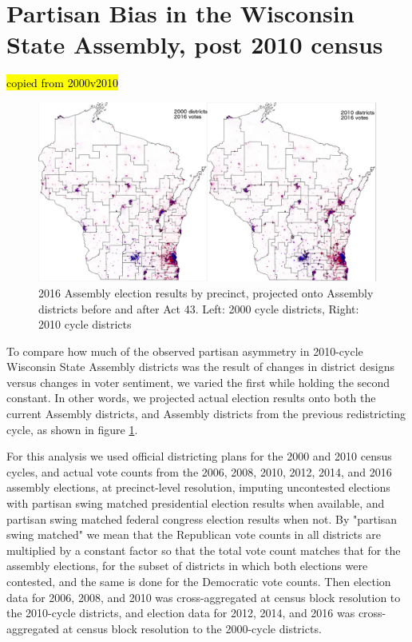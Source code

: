 \documentclass[preprint,12pt]{article}
\newcommand{\KB}[2][cyan]{ {\sethlcolor{#1} \hl{#2}} }
\begin{document}
\section{Partisan Bias in the Wisconsin State Assembly, post 2010 census\label{sec:Wis}}

\KB{copied from 2000v2010}

\begin{figure}[htb!]
    \begin{center}
        \includegraphics[scale=0.35]{../Figures/WI_compared/precincts_pop_combined.png}
        \caption{2016 Assembly election results by precinct, projected onto Assembly districts before and after Act 43. Left: 2000 cycle districts, Right: 2010 cycle districts}\label{fig:MapsWI}
    \end{center}
\end{figure}

To compare how much of the observed partisan asymmetry in 2010-cycle Wisconsin State Assembly districts was the result of changes in district designs versus changes in voter sentiment, we varied the first while holding the second constant.
In other words, we projected actual election results onto both the current Assembly districts, and Assembly districts from the previous redistricting cycle, as shown in figure \ref{fig:MapsWI}.

For this analysis we used official districting plans for the 2000 and 2010 census cycles, and actual vote counts from the 2006, 2008, 2010, 2012, 2014, and 2016 assembly elections, at precinct-level resolution, imputing uncontested elections with partisan swing matched presidential election results when available, and partisan swing matched federal congress election results when not.
By "partisan swing matched" we mean that the Republican vote counts in all districts are multiplied by a constant factor so that the total vote count matches that for the assembly elections, for the subset of districts in which both elections were contested, and the same is done for the Democratic vote counts.
Then election data for 2006, 2008, and 2010 was cross-aggregated at census block resolution to the 2010-cycle districts, and election data for 2012, 2014, and 2016 was cross-aggregated at census block resolution to the 2000-cycle districts. 
 
\end{document}
